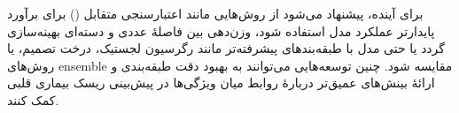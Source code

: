 برای آینده، پیشنهاد می‌شود از روش‌هایی مانند اعتبارسنجی متقابل () برای برآورد
پایدارتر عملکرد مدل استفاده شود، وزن‌دهی بین فاصلهٔ عددی و دسته‌ای بهینه‌سازی گردد یا حتی مدل با
طبقه‌بندهای پیشرفته‌تر مانند رگرسیون لجستیک، درخت تصمیم،  یا روش‌های ensemble مقایسه شود.
چنین توسعه‌هایی می‌توانند به بهبود دقت طبقه‌بندی و ارائهٔ بینش‌های عمیق‌تر دربارهٔ روابط میان
ویژگی‌ها در پیش‌بینی ریسک بیماری قلبی کمک کنند.
